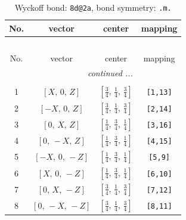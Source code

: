 \documentclass[fleqn,8pt]{jsarticle}
\begin{document}
\begin{longtable}{cccc}
\caption{Wyckoff bond: {\tt 8d@2a}, bond symmetry: {\tt .m.}}
 \\
 \hline \hline
No. & vector & center & mapping \\ \hline \endfirsthead

\multicolumn{3}{l}{\tablename\ \thetable{}} \\
 \hline \hline
No. & vector & center & mapping \\ \hline \endhead

 \hline \hline
\multicolumn{3}{r}{\footnotesize\it continued ...} \\ \endfoot

 \hline \hline
\multicolumn{3}{r}{} \\ \endlastfoot

1 & $\left[ X,\, 0,\, Z \right]$ & $\left[ \frac{3}{4},\, \frac{1}{4},\, \frac{3}{4} \right]$ & {\tt [1,13]} \\ \hline
2 & $\left[ - X,\, 0,\, Z \right]$ & $\left[ \frac{3}{4},\, \frac{1}{4},\, \frac{3}{4} \right]$ & {\tt [2,14]} \\ \hline
3 & $\left[ 0,\, X,\, Z \right]$ & $\left[ \frac{1}{4},\, \frac{3}{4},\, \frac{1}{4} \right]$ & {\tt [3,16]} \\ \hline
4 & $\left[ 0,\, - X,\, Z \right]$ & $\left[ \frac{1}{4},\, \frac{3}{4},\, \frac{1}{4} \right]$ & {\tt [4,15]} \\ \hline
5 & $\left[ - X,\, 0,\, - Z \right]$ & $\left[ \frac{1}{4},\, \frac{3}{4},\, \frac{1}{4} \right]$ & {\tt [5,9]} \\ \hline
6 & $\left[ X,\, 0,\, - Z \right]$ & $\left[ \frac{1}{4},\, \frac{3}{4},\, \frac{1}{4} \right]$ & {\tt [6,10]} \\ \hline
7 & $\left[ 0,\, X,\, - Z \right]$ & $\left[ \frac{3}{4},\, \frac{1}{4},\, \frac{3}{4} \right]$ & {\tt [7,12]} \\ \hline
8 & $\left[ 0,\, - X,\, - Z \right]$ & $\left[ \frac{3}{4},\, \frac{1}{4},\, \frac{3}{4} \right]$ & {\tt [8,11]} \\
\end{longtable}
\renewcommand{\arraystretch}{1.2}
\end{document}
